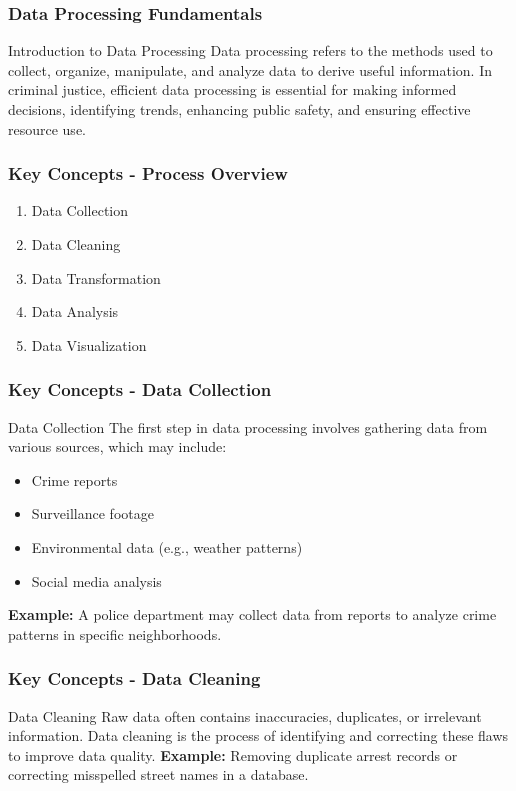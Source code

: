 \documentclass[aspectratio=169]{beamer}
\begin{document}
\begin{frame}[fragile]
    \frametitle{Data Processing Fundamentals}
    \begin{block}{Introduction to Data Processing}
        Data processing refers to the methods used to collect, organize, manipulate, and analyze data to derive useful information. 
        In criminal justice, efficient data processing is essential for making informed decisions, identifying trends, enhancing public safety, and ensuring effective resource use.
    \end{block}
\end{frame}

\begin{frame}[fragile]
    \frametitle{Key Concepts - Process Overview}
    \begin{enumerate}
        \item Data Collection
        \item Data Cleaning
        \item Data Transformation
        \item Data Analysis
        \item Data Visualization
    \end{enumerate}
\end{frame}

\begin{frame}[fragile]
    \frametitle{Key Concepts - Data Collection}
    \begin{block}{Data Collection}
        The first step in data processing involves gathering data from various sources, which may include:
        \begin{itemize}
            \item Crime reports
            \item Surveillance footage
            \item Environmental data (e.g., weather patterns)
            \item Social media analysis
        \end{itemize}
        \textbf{Example:} A police department may collect data from reports to analyze crime patterns in specific neighborhoods.
    \end{block}
\end{frame}

\begin{frame}[fragile]
    \frametitle{Key Concepts - Data Cleaning}
    \begin{block}{Data Cleaning}
        Raw data often contains inaccuracies, duplicates, or irrelevant information. 
        Data cleaning is the process of identifying and correcting these flaws to improve data quality.
        \textbf{Example:} Removing duplicate arrest records or correcting misspelled street names in a database.
    \end{block}
\end{frame}
\end{document}
